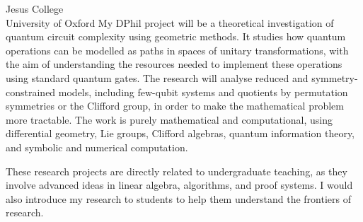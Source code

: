 \documentclass{letter}
\begin{document}
\begin{letter}{Jesus College \\ University of Oxford}
My DPhil project will be a theoretical investigation of quantum circuit complexity using geometric methods. It studies how quantum operations can be modelled as paths in spaces of unitary transformations, with the aim of understanding the resources needed to implement these operations using standard quantum gates. 
The research will analyse reduced and symmetry-constrained models, including few-qubit systems and quotients by permutation symmetries or the Clifford group, in order to make the mathematical problem more tractable. 
The work is purely mathematical and computational, using differential geometry, Lie groups, Clifford algebras, quantum information theory, and symbolic and numerical computation. 

These research projects are directly related to undergraduate teaching, as they involve advanced ideas in linear algebra, algorithms, and proof systems. 
I would also introduce my research to students to help them understand the frontiers of research.

\end{letter}
\end{document}
